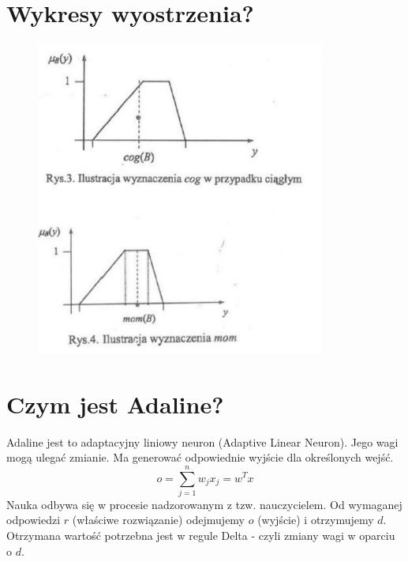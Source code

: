 \documentclass[a4paper,12pt]{article}
\begin{document}
\section{Wykresy wyostrzenia?}
\begin{figure}[H]
    \centering
    \includegraphics[width=0.85\textwidth]{img/Wykresy.png}
    \label{fig:moj_obrazek}
\end{figure}
\newpage
\section{Czym jest Adaline?}
Adaline jest to adaptacyjny liniowy neuron (Adaptive Linear Neuron). Jego wagi mogą ulegać
zmianie. Ma generować odpowiednie wyjście dla określonych wejść.
\[
    o = \sum_{j = 1}^{n}w_j x_j = w^T x
\]
Nauka odbywa się w procesie nadzorowanym z tzw. nauczycielem. Od wymaganej odpowiedzi \textbf{$r$} (właściwe rozwiązanie)
odejmujemy \textbf{$o$} (wyjście) i otrzymujemy \textbf{$d$}. Otrzymana wartość potrzebna jest w regule Delta - czyli zmiany wagi
w oparciu o \textbf{$d$}.
\end{document}

